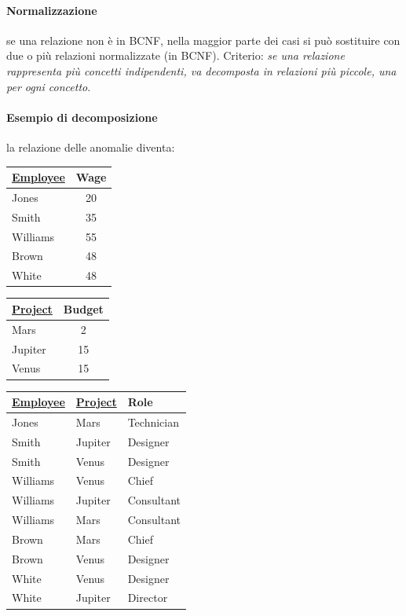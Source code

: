 \documentclass[a4paper,12pt]{article}
\begin{document}
\paragraph{Normalizzazione} se una relazione non è in BCNF, nella maggior parte
dei casi si può sostituire con due o più relazioni normalizzate (in BCNF).
Criterio: \emph{se una relazione rappresenta più concetti indipendenti, va
decomposta in relazioni più piccole, una per ogni concetto}.

\paragraph{Esempio di decomposizione} la relazione delle anomalie diventa:
\begin{center}
\begin{tabular}{|l|c|}
\hline
\underline{Employee} & Wage\\ \hline
Jones & 20\\ Smith & 35\\ Williams & 55\\ Brown & 48\\ White & 48\\ \hline
\end{tabular}
\quad
\begin{tabular}{|l|c|}
\hline
\underline{Project} & Budget\\ \hline
Mars & 2\\ Jupiter & 15\\ Venus & 15\\ \hline
\end{tabular}
\quad
\begin{tabular}{|l|l|l|}
\hline
\underline{Employee} & \underline{Project} & Role\\ \hline
Jones & Mars & Technician\\ Smith & Jupiter & Designer\\
Smith & Venus & Designer\\ Williams & Venus & Chief\\
Williams & Jupiter & Consultant\\ Williams & Mars & Consultant\\
Brown & Mars & Chief\\ Brown & Venus & Designer\\
White & Venus & Designer\\ White & Jupiter & Director\\ \hline
\end{tabular}
\end{center}
\end{document}

